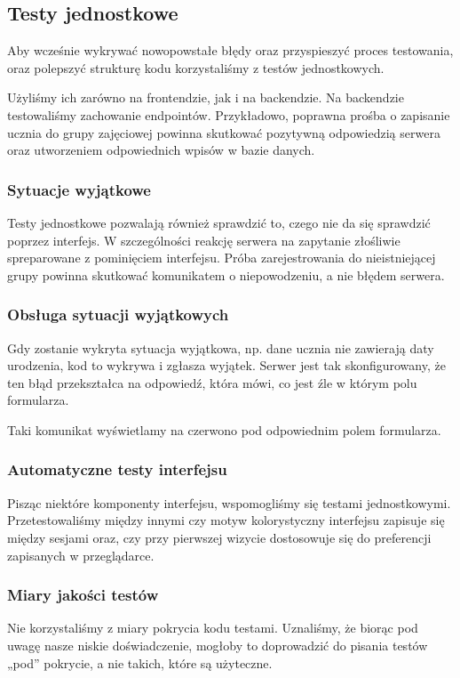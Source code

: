 \documentclass{article}
\begin{document}
\subsection{Testy jednostkowe}
Aby wcześnie wykrywać nowopowstałe błędy oraz przyspieszyć proces testowania,
oraz polepszyć strukturę kodu korzystaliśmy z testów jednostkowych.

Użyliśmy ich zarówno na frontendzie, jak i na backendzie. Na backendzie testowaliśmy
zachowanie endpointów. Przykładowo, poprawna prośba o zapisanie ucznia do grupy
zajęciowej powinna skutkować pozytywną odpowiedzią serwera oraz utworzeniem
odpowiednich wpisów w bazie danych.

\subsubsection{Sytuacje wyjątkowe}
Testy jednostkowe pozwalają również sprawdzić to, czego nie da się sprawdzić poprzez
interfejs. W szczególności reakcję serwera na zapytanie złośliwie spreparowane
z pominięciem interfejsu. Próba zarejestrowania do nieistniejącej grupy powinna
skutkować komunikatem o niepowodzeniu, a nie błędem serwera.

\subsubsection{Obsługa sytuacji wyjątkowych}
Gdy zostanie wykryta sytuacja wyjątkowa, np. dane ucznia nie zawierają daty urodzenia,
kod to wykrywa i zgłasza wyjątek. Serwer jest tak skonfigurowany, że ten błąd
przekształca na odpowiedź, która mówi, co jest źle w którym polu formularza.

Taki komunikat wyświetlamy na czerwono pod odpowiednim polem formularza.

\subsubsection{Automatyczne testy interfejsu}
Pisząc niektóre komponenty interfejsu, wspomogliśmy się testami jednostkowymi.
Przetestowaliśmy między innymi czy motyw kolorystyczny interfejsu zapisuje się
między sesjami oraz, czy przy pierwszej wizycie dostosowuje się do preferencji
zapisanych w przeglądarce.

\subsubsection{Miary jakości testów}
Nie korzystaliśmy z miary pokrycia kodu testami. Uznaliśmy, że biorąc pod uwagę
nasze niskie doświadczenie, mogłoby to doprowadzić do pisania testów „pod” pokrycie,
a nie takich, które są użyteczne.
\end{document}
